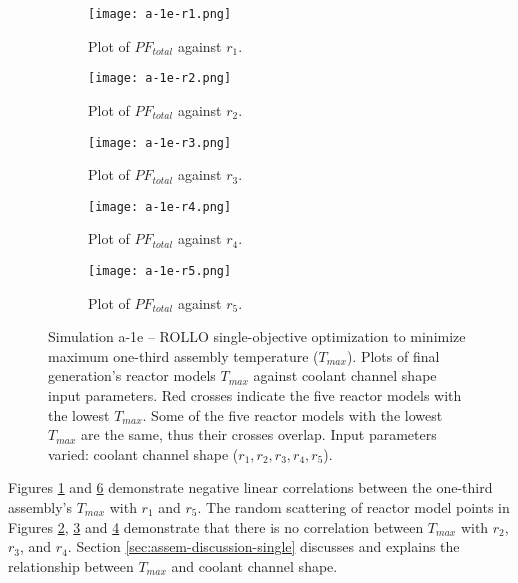 \begin{figure}[htbp!]
    \ContinuedFloat
    \centering
    \begin{subfigure}{0.49\textwidth}
        \texttt{[image: a-1e-r1.png]}
        \caption{Plot of $PF_{total}$ against $r_1$.}
        \label{fig:a-1e-r1} 
    \end{subfigure}
    \begin{subfigure}{0.49\textwidth}
        \texttt{[image: a-1e-r2.png]}
        \caption{Plot of $PF_{total}$ against $r_2$.}
        \label{fig:a-1e-r2} 
    \end{subfigure}
    \begin{subfigure}{0.49\textwidth}
        \texttt{[image: a-1e-r3.png]}
        \caption{Plot of $PF_{total}$ against $r_3$.}
        \label{fig:a-1e-r3} 
    \end{subfigure}
    \begin{subfigure}{0.49\textwidth}
        \texttt{[image: a-1e-r4.png]}
        \caption{Plot of $PF_{total}$ against $r_4$.}
        \label{fig:a-1e-r4} 
    \end{subfigure}
    \begin{subfigure}{0.49\textwidth}
        \texttt{[image: a-1e-r5.png]}
        \caption{Plot of $PF_{total}$ against $r_5$.}
        \label{fig:a-1e-r5} 
    \end{subfigure}
    \caption{Simulation a-1e -- ROLLO single-objective optimization to minimize 
    maximum one-third assembly temperature ($T_{max}$). 
    Plots of final generation's reactor models $T_{max}$ against 
    coolant channel shape input parameters. 
    Red crosses indicate the five reactor models with the lowest $T_{max}$.
    Some of the five reactor models with the lowest $T_{max}$ are the same, thus 
    their crosses overlap.
    Input parameters varied: coolant channel shape ($r_1, r_2, r_3, r_4, r_5$).}
\end{figure}

Figures \ref{fig:a-1e-r1} and \ref{fig:a-1e-r5} demonstrate negative linear 
correlations between the one-third assembly's $T_{max}$ with $r_1$ and $r_5$. 
The random scattering of reactor model points in Figures \ref{fig:a-1e-r2}, 
\ref{fig:a-1e-r3} and \ref{fig:a-1e-r4} demonstrate that 
there is no correlation between $T_{max}$ with $r_2$, $r_3$, and $r_4$. 
Section \ref{sec:assem-discussion-single} discusses and explains the relationship 
between $T_{max}$ and coolant channel shape. 

